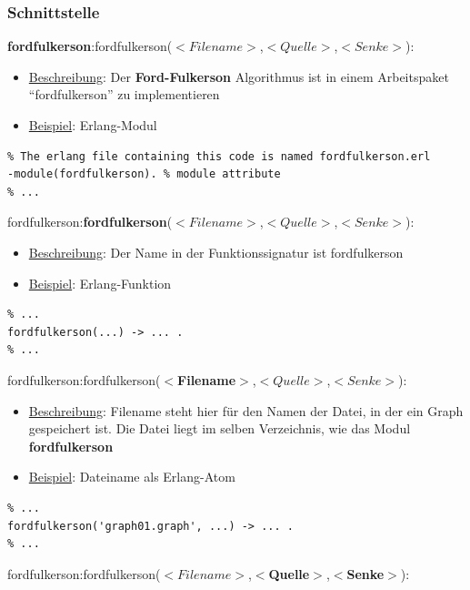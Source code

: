\documentclass[11pt]{article}
\begin{document}
\subsubsection{Schnittstelle}
\textbf{fordfulkerson}:fordfulkerson($<Filename>$,$<Quelle>$,$<Senke>$):\\ 
\begin{itemize}
\item \underline{Beschreibung}: Der \textbf{Ford-Fulkerson} Algorithmus ist in einem Arbeitspaket\\ "`fordfulkerson"' zu implementieren
\item \underline{Beispiel}: Erlang-Modul
\end{itemize}
\begin{lstlisting}
% The erlang file containing this code is named fordfulkerson.erl
-module(fordfulkerson). % module attribute
% ...
\end{lstlisting}
fordfulkerson:\textbf{fordfulkerson}($<Filename>$,$<Quelle>$,$<Senke>$):\\ 
\begin{itemize}
\item \underline{Beschreibung}: Der Name in der Funktionssignatur ist fordfulkerson
\item \underline{Beispiel}: Erlang-Funktion
\end{itemize}
\begin{lstlisting}
% ...
fordfulkerson(...) -> ... .
% ...
\end{lstlisting}
fordfulkerson:fordfulkerson($<$\textbf{Filename}$>$,$<Quelle>$,$<Senke>$):\\ 
\begin{itemize}
\item \underline{Beschreibung}: Filename steht hier f\"ur den Namen der Datei, in der ein Graph gespeichert ist. Die Datei liegt im selben Verzeichnis, wie das Modul \textbf{fordfulkerson}
\item \underline{Beispiel}: Dateiname als Erlang-Atom
\end{itemize}
\begin{lstlisting}
% ...
fordfulkerson('graph01.graph', ...) -> ... .
% ...
\end{lstlisting}
fordfulkerson:fordfulkerson($<Filename>$,$<$\textbf{Quelle}$>$,$<$\textbf{Senke}$>$):\\ 
\end{document}

